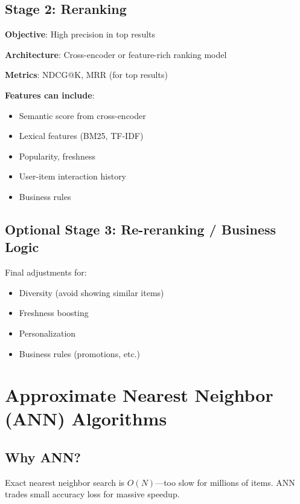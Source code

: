 \subsection{Stage 2: Reranking}

\textbf{Objective}: High precision in top results

\textbf{Architecture}: Cross-encoder or feature-rich ranking model

\textbf{Metrics}: NDCG@K, MRR (for top results)

\textbf{Features can include}:
\begin{itemize}
    \item Semantic score from cross-encoder
    \item Lexical features (BM25, TF-IDF)
    \item Popularity, freshness
    \item User-item interaction history
    \item Business rules
\end{itemize}

\subsection{Optional Stage 3: Re-reranking / Business Logic}

Final adjustments for:
\begin{itemize}
    \item Diversity (avoid showing similar items)
    \item Freshness boosting
    \item Personalization
    \item Business rules (promotions, etc.)
\end{itemize}

\section{Approximate Nearest Neighbor (ANN) Algorithms}
\label{sec:ann}

\subsection{Why ANN?}

Exact nearest neighbor search is $O(N)$—too slow for millions of items. ANN trades small accuracy loss for massive speedup.

